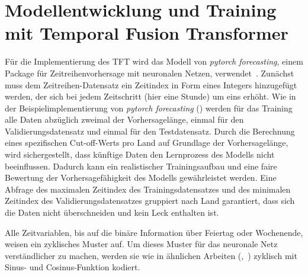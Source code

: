 \section{Modellentwicklung und Training mit Temporal Fusion Transformer}
Für die Implementierung des \ac{TFT} wird das Modell von \textit{pytorch forecasting}, einem Package für Zeitreihenvorhersage mit neuronalen Netzen, verwendet~\cite{PytorchForecastingDocumentation.20230410T20:05:46.000Z}.
Zunächst muss dem Zeitreihen-Datensatz ein Zeitindex in Form eines Integers hinzugefügt werden, der sich bei jedem Zeitschritt (hier eine Stunde) um eins erhöht.
Wie in der Beispielimplementierung von \textit{pytorch forecasting} (\cite{GitHub.20240307T20:56:16.000Z}) werden für das Training alle Daten abzüglich zweimal der Vorhersagelänge, einmal für den Validierungsdatensatz und einmal für den Testdatensatz.
Durch die Berechnung eines spezifischen Cut-off-Werts pro Land auf Grundlage der Vorhersagelänge, wird sichergestellt, dass künftige Daten den Lernprozess des Modells nicht beeinflussen.
Dadurch kann ein realistischer Trainingsaufbau und eine faire Bewertung der Vorhersagefähigkeit des Modells gewährleistet werden.
Eine Abfrage des maximalen Zeitindex des Trainingsdatensatzes und des minimalen Zeitindex des Validierungsdatensatzes gruppiert nach Land garantiert, dass sich die Daten nicht überschneiden und kein Leck enthalten ist.

Alle Zeitvariablen, bis auf die binäre Information über Feiertag oder Wochenende, weisen ein zyklisches Muster auf.
Um dieses Muster für das neuronale Netz verständlicher zu machen, werden sie wie in ähnlichen Arbeiten (\cite{Giacomazzi.06202023},~\cite{Labiadh.2.8.2023}) zyklisch mit Sinus- und Cosinus-Funktion kodiert.

